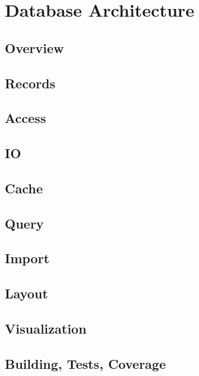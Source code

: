 \section{Database Architecture}

\subsection{Overview}

\subsection{Records}

\subsection{Access}

\subsection{IO}

\subsection{Cache}

\subsection{Query}

\subsection{Import}

\subsection{Layout}

\subsection{Visualization}

\subsection{Building, Tests, Coverage}



